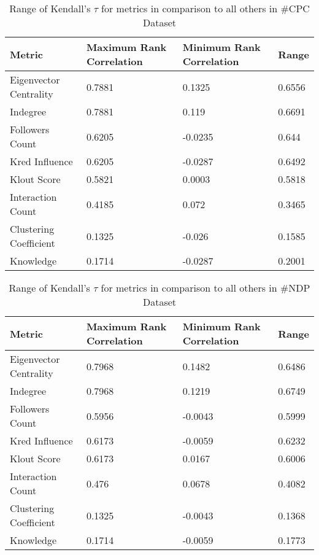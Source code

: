 \documentclass[a4paper,12pt]{article}
\begin{document}
\begin{table}[position specifier]\footnotesize
  \centering
  \begin{tabular}{| l | l | l | l |}
    \hline
      Metric & Maximum Rank Correlation & Minimum Rank Correlation & Range \\ \hline
      Eigenvector Centrality & 0.7881 & 0.1325 & 0.6556 \\ \hline
      Indegree & 0.7881 & 0.119 & 0.6691 \\ \hline
      Followers Count & 0.6205 & -0.0235 & 0.644 \\ \hline
      Kred Influence & 0.6205 & -0.0287 & 0.6492 \\ \hline
      Klout Score & 0.5821 & 0.0003 & 0.5818 \\ \hline
      Interaction Count & 0.4185 & 0.072 & 0.3465 \\ \hline
      Clustering Coefficient & 0.1325 & -0.026 & 0.1585 \\ \hline
      Knowledge & 0.1714 & -0.0287 & 0.2001 \\ \hline
    \hline
  \end{tabular}
  \caption{Range of Kendall's $\tau$ for metrics in comparison to all others in \#CPC Dataset}
  \label{tab:cpc_ranges}
\end{table}


\begin{table}[position specifier]\footnotesize
  \centering
  \begin{tabular}{| l | l | l | l |}
    \hline
      Metric & Maximum Rank Correlation & Minimum Rank Correlation & Range \\ \hline
      Eigenvector Centrality & 0.7968 & 0.1482 & 0.6486 \\ \hline
      Indegree & 0.7968 & 0.1219 & 0.6749 \\ \hline
      Followers Count & 0.5956 & -0.0043 & 0.5999 \\ \hline
      Kred Influence & 0.6173 & -0.0059 & 0.6232 \\ \hline
      Klout Score & 0.6173 & 0.0167 & 0.6006 \\ \hline
      Interaction Count & 0.476 & 0.0678 & 0.4082 \\ \hline
      Clustering Coefficient & 0.1325 & -0.0043 & 0.1368 \\ \hline
      Knowledge & 0.1714 & -0.0059 & 0.1773 \\ \hline
      
    \hline
  \end{tabular}
  \caption{Range of Kendall's $\tau$ for metrics in comparison to all others in \#NDP Dataset}
  \label{tab:ndp_ranges}
\end{table}


\end{document}

